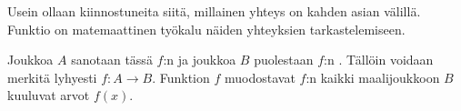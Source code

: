 Usein ollaan kiinnostuneita siitä, millainen yhteys on kahden asian välillä. Funktio on matemaattinen työkalu näiden yhteyksien tarkastelemiseen.

Joukkoa $A$ sanotaan tässä $f$:n  ja joukkoa $B$ puolestaan $f$:n . Tällöin voidaan merkitä lyhyesti $f\colon A \to B$. Funktion $f$  muodostavat $f$:n kaikki maalijoukkoon $B$ kuuluvat arvot $f(x)$.


